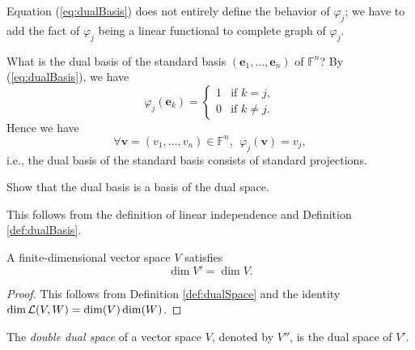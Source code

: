 \begin{rem}
  Equation (\ref{eq:dualBasis}) does not entirely define
   the behavior of $\varphi_j$;
   we have to add the fact of $\varphi_j$
   being a linear functional
   to complete graph of $\varphi_j$.
\end{rem}

\begin{rem}
  \label{rem:standardProjections}
  What is the dual basis of the standard basis
   $(\mathbf{e}_1, \ldots, \mathbf{e}_n)$
   of $\mathbb{F}^n$?
%
  By (\ref{eq:dualBasis}), we have
  \begin{displaymath}
     \varphi_j(\mathbf{e}_k) = 
     \begin{cases}
       1 & \textrm{if } k=j,
       \\
       0 & \textrm{if } k\ne j.
     \end{cases}
  \end{displaymath}
  Hence we have
  \begin{displaymath}
    \forall \mathbf{v}=(v_1,\ldots,v_n)\in \mathbb{F}^n,\ \ 
    \varphi_j(\mathbf{v}) = v_j,
  \end{displaymath}
  i.e., the dual basis of the standard basis
   consists of standard projections.
\end{rem}

\begin{exc}
  \label{exc:basicChainsCochainsAreBasis}
  Show that the dual basis is a basis of the dual space.
\end{exc}
\begin{solution}
  This follows from the definition of linear independence
   and Definition \ref{def:dualBasis}.
\end{solution}
 
\begin{lem}
  \label{lem:dimV=dimV'}
  A finite-dimensional vector space $V$ satisfies
  \begin{equation}
    \label{eq:dimV=dimV'}
     \dim V' = \dim V.
  \end{equation}
\end{lem}
\begin{proof}
  This follows from Definition \ref{def:dualSpace}
  and the identity
  $\dim {\cal L}(V,W) = \dim(V) \dim(W)$.
\end{proof}

\begin{defn}
  \label{def:doubleDualSpace}
  The \emph{double dual space} of a vector space $V$,
   denoted by $V''$, 
   is the dual space of $V'$.
\end{defn}

